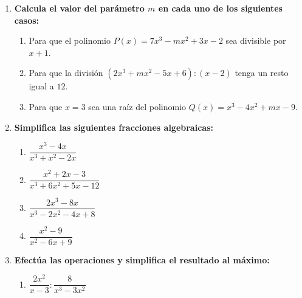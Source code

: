 \documentclass[11pt,a4paper]{article}
\begin{document}
\begin{enumerate}[label=\textbf{\arabic*.}, leftmargin=*]
\begin{enumerate}[label=\alph*), itemsep=0.8em]
            \item $x^4 - 12x^3 + 36x^2$
            \item $2x^4 + 5x^3 - 4x^2 - 3x$
            \item $x^4 - 16$
            \item $3x^3 - 12x^2 + 9x$
            \item $x^4 - 2x^3 - 7x^2 + 8x + 12$
            \item $4x - 24x^2 + 16x^3 =$
            \item $3(x - 1) + 8(x - 1)^2 - 5(x - 1) \cdot (x + 1) =$
            \item $(x + 3)^2 - 4(x + 3) \cdot (x - 3) + 6(x + 3) =$
            \item $x^2 + 4x + 4 =$
            \item $x^2 - 9 =$
            \item $25x^2 - 125 =$
        \end{enumerate}
    \item \textbf{Calcula el valor del parámetro {\color{numcolor}$m$} en cada uno de los siguientes casos:}
        \begin{enumerate}[label=\alph*), itemsep=0.8em]
            \item Para que el polinomio $P(x) = 7x^3 - mx^2 + 3x - 2$ sea divisible por $x + 1$.
            \item Para que la división $(2x^3 + mx^2 - 5x + 6) : (x - 2)$ tenga un resto igual a $12$.
            \item Para que $x = 3$ sea una raíz del polinomio $Q(x) = x^3 - 4x^2 + mx - 9$.
        \end{enumerate}
    \item \textbf{Simplifica las siguientes fracciones algebraicas:}
        \begin{enumerate}[label=\alph*), itemsep=1em]
            \item $\dfrac{x^3 - 4x}{x^3 + x^2 - 2x}$
            \item $\dfrac{x^2 + 2x - 3}{x^3 + 6x^2 + 5x - 12}$
            \item $\dfrac{2x^3 - 8x}{x^3 - 2x^2 - 4x + 8}$
            \item $\dfrac{x^2 - 9}{x^2 - 6x + 9}$
        \end{enumerate}
    \item \textbf{Efectúa las operaciones y simplifica el resultado al máximo:}
        \begin{enumerate}[label=\alph*), itemsep=1.2em]
            \item $\dfrac{2x^2}{x - 3} : \dfrac{8}{x^3 - 3x^2}$

\end{enumerate}
\end{enumerate}
\end{document}
